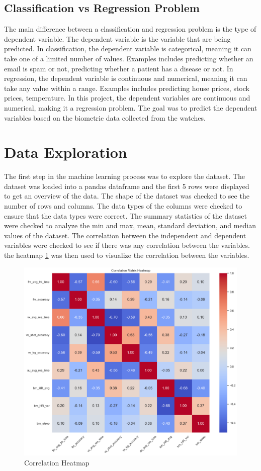 \subsection*{Classification vs Regression Problem}
The main difference between a classification and regression problem is the type of dependent variable. The dependent variable is the variable that are being predicted. In 
classification, the dependent variable is categorical, meaning it can take one of a limited number of values. Examples includes predicting whether an email is spam or not,
predicting whether a patient has a disease or not. In regression, the dependent variable is continuous and numerical, meaning it can take any value within a range. Examples 
includes predicting house prices, stock prices, temperature. In this project, the dependent variables are continuous and numerical, making it a regression problem. The goal 
was to predict the dependent variables based on the biometric data collected from the watches. 

\section{Data Exploration}
The first step in the machine learning process was to explore the dataset. The dataset was loaded into a pandas dataframe and the first 5 rows were displayed to get an overview of the
data. The shape of the dataset was checked to see the number of rows and columns. The data types of the columns were checked to ensure that the data types were correct. The summary
statistics of the dataset were checked to analyze the min and max, mean, standard deviation, and median values of the dataset. The correlation between the independent and dependent
variables were checked to see if there was any correlation between the variables. the heatmap \ref{fig:correlation_heatmap} was then used to visualize the correlation between the variables. 

\begin{figure}[H]
    \centering
    \includegraphics[width=1\textwidth]{images/correlation.png}
    \caption{Correlation Heatmap}
    \label{fig:correlation_heatmap}
\end{figure}

